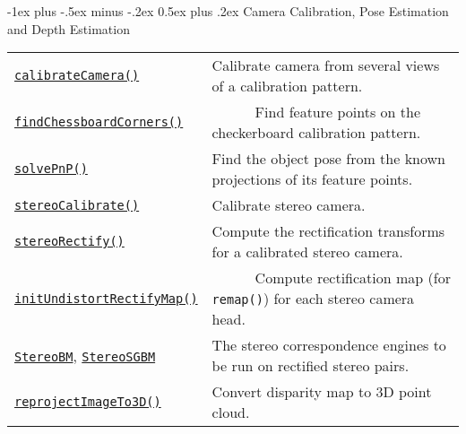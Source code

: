 \documentclass[10pt,landscape]{article}
\makeatletter
\renewcommand{\section}{\@startsection{section}{1}{0mm}%
                                {-1ex plus -.5ex minus -.2ex}%
                                {0.5ex plus .2ex}%
                                {\normalfont\large\bfseries}}
\makeatother
\begin{document}
\begin{multicols}{3}
\section{Camera Calibration, Pose Estimation and Depth Estimation}

\begin{tabular}{@{}p{\the\MyLen}%
                @{}p{\linewidth-\the\MyLen}@{}}

\texttt{\href{http://docs.opencv.org/modules/calib3d/doc/camera_calibration_and_3d_reconstruction.html\#calibratecamera}{calibrateCamera()}} & Calibrate camera from several views of a calibration pattern. \\

\texttt{\href{http://docs.opencv.org/modules/calib3d/doc/camera_calibration_and_3d_reconstruction.html\#findchessboardcorners}{findChessboardCorners()}} & \ \ \ \ \ \ Find feature points on the checkerboard calibration pattern. \\

\texttt{\href{http://docs.opencv.org/modules/calib3d/doc/camera_calibration_and_3d_reconstruction.html\#solvepnp}{solvePnP()}} & Find the object pose from the known projections of its feature points. \\

\texttt{\href{http://docs.opencv.org/modules/calib3d/doc/camera_calibration_and_3d_reconstruction.html\#stereocalibrate}{stereoCalibrate()}} & Calibrate stereo camera. \\

\texttt{\href{http://docs.opencv.org/modules/calib3d/doc/camera_calibration_and_3d_reconstruction.html\#stereorectify}{stereoRectify()}} & Compute the rectification transforms for a calibrated stereo camera.\\

\texttt{\href{http://docs.opencv.org/modules/imgproc/doc/geometric_transformations.html\#initundistortrectifymap}{initUndistortRectifyMap()}} & \ \ \ \ \ \ Compute rectification map (for \texttt{remap()}) for each stereo camera head.\\

\texttt{\href{http://docs.opencv.org/modules/calib3d/doc/camera_calibration_and_3d_reconstruction.html\#StereoBM}{StereoBM}}, \texttt{\href{http://docs.opencv.org/modules/calib3d/doc/camera_calibration_and_3d_reconstruction.html\#StereoSGBM}{StereoSGBM}} & The stereo correspondence engines to be run on rectified stereo pairs.\\

\texttt{\href{http://docs.opencv.org/modules/calib3d/doc/camera_calibration_and_3d_reconstruction.html\#reprojectimageto3d}{reprojectImageTo3D()}} & Convert disparity map to 3D point cloud.\\


\end{tabular}
\end{multicols}
\end{document}
